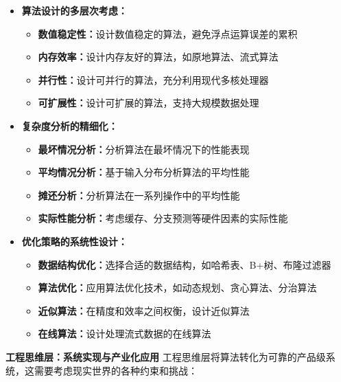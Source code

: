\begin{itemize}
\item \textbf{算法设计的多层次考虑：}
\begin{itemize}
\item \textbf{数值稳定性：}设计数值稳定的算法，避免浮点运算误差的累积
\item \textbf{内存效率：}设计内存友好的算法，如原地算法、流式算法
\item \textbf{并行性：}设计可并行的算法，充分利用现代多核处理器
\item \textbf{可扩展性：}设计可扩展的算法，支持大规模数据处理
\end{itemize}

\item \textbf{复杂度分析的精细化：}
\begin{itemize}
\item \textbf{最坏情况分析：}分析算法在最坏情况下的性能表现
\item \textbf{平均情况分析：}基于输入分布分析算法的平均性能
\item \textbf{摊还分析：}分析算法在一系列操作中的平均性能
\item \textbf{实际性能分析：}考虑缓存、分支预测等硬件因素的实际性能
\end{itemize}

\item \textbf{优化策略的系统性设计：}
\begin{itemize}
\item \textbf{数据结构优化：}选择合适的数据结构，如哈希表、B+树、布隆过滤器
\item \textbf{算法优化：}应用算法优化技术，如动态规划、贪心算法、分治算法
\item \textbf{近似算法：}在精度和效率之间权衡，设计近似算法
\item \textbf{在线算法：}设计处理流式数据的在线算法
\end{itemize}
\end{itemize}

\textbf{工程思维层：系统实现与产业化应用}
工程思维层将算法转化为可靠的产品级系统，这需要考虑现实世界的各种约束和挑战：

